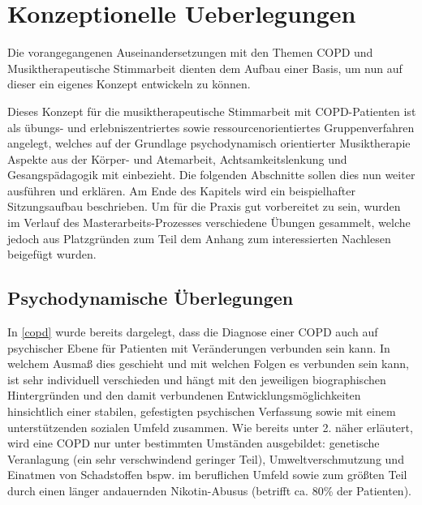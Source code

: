 
\ifpdf
\graphicspath{{4_konzept/figures/PNG/}{4_konzept/figures/PDF/}{4_konzept/figures/}}
\else
    \graphicspath{{4_konzept/figures/EPS/}{4_konzept/figures/}}
\fi

\chapter{Konzeptionelle Ueberlegungen}
\label{chapter:konzeptionelle_ueberlegungen}
Die vorangegangenen Auseinandersetzungen mit den Themen COPD und Musiktherapeutische Stimmarbeit dienten dem Aufbau einer Basis, um nun auf dieser ein eigenes Konzept entwickeln zu können. 

Dieses Konzept für die musiktherapeutische Stimmarbeit mit COPD-Patienten ist als übungs- und erlebniszentriertes sowie ressourcenorientiertes Gruppenverfahren angelegt, welches auf der Grundlage psychodynamisch orientierter Musiktherapie Aspekte aus der Körper- und Atemarbeit, Achtsamkeitslenkung und Gesangspädagogik mit einbezieht. Die folgenden Abschnitte sollen dies nun weiter ausführen und erklären. Am Ende des Kapitels wird ein beispielhafter Sitzungsaufbau beschrieben. Um für die Praxis gut vorbereitet zu sein, wurden im Verlauf des Masterarbeits-Prozesses verschiedene Übungen gesammelt, welche jedoch aus Platzgründen zum Teil dem Anhang zum interessierten Nachlesen beigefügt wurden.


\section{Psychodynamische Überlegungen}
\label{psychodynamische ueberlegungen}
In \ref{copd} wurde bereits dargelegt, dass die Diagnose einer COPD auch auf psychischer Ebene für Patienten mit Veränderungen verbunden sein kann. In welchem Ausmaß dies geschieht und mit welchen Folgen es verbunden sein kann, ist sehr individuell verschieden und hängt mit den jeweiligen biographischen Hintergründen und den damit verbundenen Entwicklungsmöglichkeiten hinsichtlich einer stabilen, gefestigten psychischen Verfassung sowie mit einem unterstützenden sozialen Umfeld zusammen. 
Wie bereits unter 2. näher erläutert, wird eine COPD nur unter bestimmten Umständen ausgebildet: genetische Veranlagung (ein sehr verschwindend geringer Teil), Umweltverschmutzung und Einatmen von Schadstoffen bspw. im beruflichen Umfeld sowie zum größten Teil durch einen länger andauernden Nikotin-Abusus (betrifft ca. 80\% der Patienten). 

